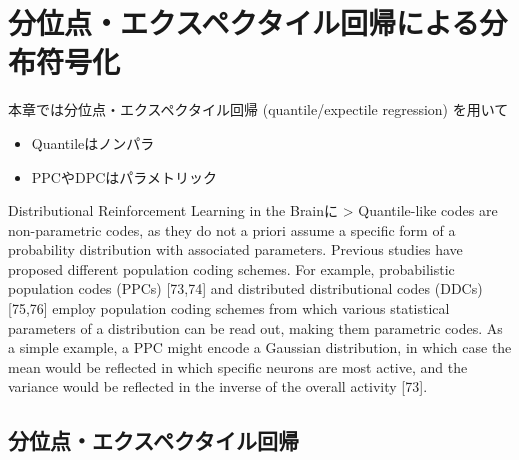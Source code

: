 \section{分位点・エクスペクタイル回帰による分布符号化}
本章では分位点・エクスペクタイル回帰 (quantile/expectile regression) を用いて
\begin{itemize}
\item Quantileはノンパラ
\item PPCやDPCはパラメトリック
\end{itemize}
Distributional Reinforcement Learning in the Brainに
> Quantile-like codes are non-parametric codes, as they do not a priori assume a specific form of a probability distribution with associated parameters. Previous studies have proposed different population coding schemes. For example, probabilistic population codes (PPCs) [73,74] and distributed distributional codes (DDCs) [75,76] employ population coding schemes from which various statistical parameters of a distribution can be read out, making them parametric codes. As a simple example, a PPC might encode a Gaussian distribution, in which case the mean would be reflected in which specific neurons are most active, and the variance would be reflected in the inverse of the overall activity [73].
\subsection{分位点・エクスペクタイル回帰}
